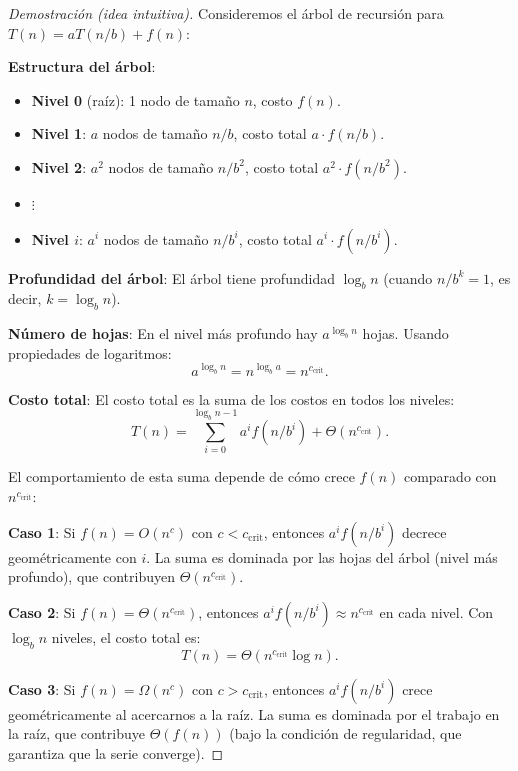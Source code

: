 \documentclass[a4paper,11pt]{report}
\begin{document}
\begin{proof}[Demostración (idea intuitiva)]
Consideremos el árbol de recursión para $T(n) = aT(n/b) + f(n)$:

\textbf{Estructura del árbol}:
\begin{itemize}
\item \textbf{Nivel 0} (raíz): 1 nodo de tamaño $n$, costo $f(n)$.
\item \textbf{Nivel 1}: $a$ nodos de tamaño $n/b$, costo total $a \cdot f(n/b)$.
\item \textbf{Nivel 2}: $a^2$ nodos de tamaño $n/b^2$, costo total $a^2 \cdot f(n/b^2)$.
\item $\vdots$
\item \textbf{Nivel $i$}: $a^i$ nodos de tamaño $n/b^i$, costo total $a^i \cdot f(n/b^i)$.
\end{itemize}

\textbf{Profundidad del árbol}: El árbol tiene profundidad $\log_b n$ (cuando $n/b^k = 1$, es decir, $k = \log_b n$).

\textbf{Número de hojas}: En el nivel más profundo hay $a^{\log_b n}$ hojas. Usando propiedades de logaritmos:
\[
a^{\log_b n} = n^{\log_b a} = n^{c_{\text{crit}}}.
\]

\textbf{Costo total}: El costo total es la suma de los costos en todos los niveles:
\[
T(n) = \sum_{i=0}^{\log_b n - 1} a^i f(n/b^i) + \Theta(n^{c_{\text{crit}}}).
\]

El comportamiento de esta suma depende de cómo crece $f(n)$ comparado con $n^{c_{\text{crit}}}$:

\textbf{Caso 1}: Si $f(n) = O(n^c)$ con $c < c_{\text{crit}}$, entonces $a^i f(n/b^i)$ decrece geométricamente con $i$. La suma es dominada por las hojas del árbol (nivel más profundo), que contribuyen $\Theta(n^{c_{\text{crit}}})$.

\textbf{Caso 2}: Si $f(n) = \Theta(n^{c_{\text{crit}}})$, entonces $a^i f(n/b^i) \approx n^{c_{\text{crit}}}$ en cada nivel. Con $\log_b n$ niveles, el costo total es:
\[
T(n) = \Theta(n^{c_{\text{crit}}} \log n).
\]

\textbf{Caso 3}: Si $f(n) = \Omega(n^c)$ con $c > c_{\text{crit}}$, entonces $a^i f(n/b^i)$ crece geométricamente al acercarnos a la raíz. La suma es dominada por el trabajo en la raíz, que contribuye $\Theta(f(n))$ (bajo la condición de regularidad, que garantiza que la serie converge).
\end{proof}
\end{document}
